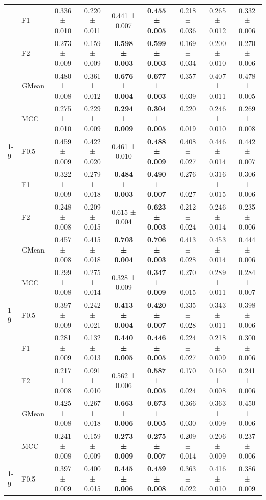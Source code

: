 \begin{table}[H]
{\begin{tabular}{llccccccc}
 & F1 & 0.336 ± 0.010 & 0.220 ± 0.011 & 0.441 ± 0.007 & \textbf{0.455 ± 0.005} & 0.218 ± 0.036 & 0.265 ± 0.012 & 0.332 ± 0.006 \\
 & F2 & 0.273 ± 0.009 & 0.159 ± 0.009 & \textbf{0.598 ± 0.003} & \textbf{0.599 ± 0.003} & 0.169 ± 0.034 & 0.200 ± 0.010 & 0.270 ± 0.006 \\
 & GMean & 0.480 ± 0.008 & 0.361 ± 0.012 & \textbf{0.676 ± 0.004} & \textbf{0.677 ± 0.003} & 0.357 ± 0.039 & 0.407 ± 0.011 & 0.478 ± 0.005 \\
 & MCC & 0.275 ± 0.010 & 0.229 ± 0.009 & \textbf{0.294 ± 0.009} & \textbf{0.304 ± 0.005} & 0.220 ± 0.019 & 0.246 ± 0.010 & 0.269 ± 0.008 \\
\cline{1-9}
\multirow[t]{5}{*}{TabICL} & F0.5 & 0.459 ± 0.009 & 0.422 ± 0.020 & 0.461 ± 0.010 & \textbf{0.488 ± 0.009} & 0.408 ± 0.027 & 0.446 ± 0.014 & 0.442 ± 0.007 \\
 & F1 & 0.322 ± 0.009 & 0.279 ± 0.018 & \textbf{0.484 ± 0.003} & \textbf{0.490 ± 0.007} & 0.276 ± 0.027 & 0.316 ± 0.015 & 0.306 ± 0.006 \\
 & F2 & 0.248 ± 0.008 & 0.209 ± 0.015 & 0.615 ± 0.004 & \textbf{0.623 ± 0.003} & 0.212 ± 0.024 & 0.246 ± 0.014 & 0.235 ± 0.006 \\
 & GMean & 0.457 ± 0.008 & 0.415 ± 0.018 & \textbf{0.703 ± 0.004} & \textbf{0.706 ± 0.003} & 0.413 ± 0.028 & 0.453 ± 0.014 & 0.444 ± 0.006 \\
 & MCC & 0.299 ± 0.008 & 0.275 ± 0.014 & 0.328 ± 0.009 & \textbf{0.347 ± 0.009} & 0.270 ± 0.015 & 0.289 ± 0.011 & 0.284 ± 0.007 \\
\cline{1-9}
\multirow[t]{5}{*}{TabM} & F0.5 & 0.397 ± 0.009 & 0.242 ± 0.021 & \textbf{0.413 ± 0.004} & \textbf{0.420 ± 0.007} & 0.335 ± 0.028 & 0.343 ± 0.011 & 0.398 ± 0.006 \\
 & F1 & 0.281 ± 0.009 & 0.132 ± 0.013 & \textbf{0.440 ± 0.005} & \textbf{0.446 ± 0.005} & 0.224 ± 0.027 & 0.218 ± 0.009 & 0.300 ± 0.006 \\
 & F2 & 0.217 ± 0.008 & 0.091 ± 0.010 & 0.562 ± 0.006 & \textbf{0.587 ± 0.005} & 0.170 ± 0.024 & 0.160 ± 0.008 & 0.241 ± 0.006 \\
 & GMean & 0.425 ± 0.008 & 0.267 ± 0.018 & \textbf{0.663 ± 0.006} & \textbf{0.673 ± 0.005} & 0.366 ± 0.030 & 0.363 ± 0.009 & 0.450 ± 0.006 \\
 & MCC & 0.241 ± 0.008 & 0.159 ± 0.009 & \textbf{0.273 ± 0.009} & \textbf{0.275 ± 0.007} & 0.209 ± 0.014 & 0.206 ± 0.009 & 0.237 ± 0.006 \\
\cline{1-9}
\multirow[t]{5}{*}{TabPFN} & F0.5 & 0.397 ± 0.009 & 0.400 ± 0.015 & \textbf{0.445 ± 0.006} & \textbf{0.459 ± 0.008} & 0.363 ± 0.022 & 0.416 ± 0.010 & 0.386 ± 0.009 \\

\end{tabular}}
\end{table}
